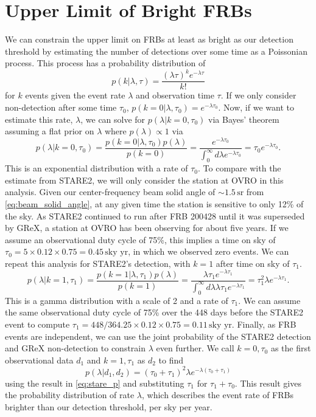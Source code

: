 \section{Upper Limit of Bright FRBs} \label{sec:rate}

We can constrain the upper limit on FRBs at least as bright as our detection threshold by estimating the number of detections over some time as a Poissonian process.
This process has a probability distribution of
\begin{equation}
    p(k|\lambda,\tau) = \frac{(\lambda\tau)^ke^{-\lambda\tau}}{k!}
\end{equation}
for $k$ events given the event rate $\lambda$ and observation time $\tau$.
If we only consider non-detection after some time $\tau_0$, $p(k=0|\lambda,\tau_0)=e^{-\lambda\tau_0}$.
Now, if we want to estimate this rate, $\lambda$, we can solve for $p(\lambda|k=0,\tau_0)$ via Bayes' theorem assuming a flat prior on $\lambda$ where $p(\lambda)\propto1$ via
\begin{equation}
    p(\lambda|k=0,\tau_0) = \frac{p(k=0|\lambda,\tau_0)p(\lambda)}{p(k=0)}=\frac{e^{-\lambda\tau_0}}{\int_{0}^{\infty}d\lambda e^{-\lambda\tau_0}} = \tau_0 e^{-\lambda\tau_0}.
\end{equation}
This is an exponential distribution with a rate of $\tau_0$.
To compare with the estimate from STARE2, we will only consider the station at OVRO in this analysis.
Given our center-frequency beam solid angle of $\sim1.5\,\text{sr}$ from \autoref{eq:beam_solid_angle}, at any given time the station is sensitive to only 12\% of the sky.
As STARE2 continued to run after FRB 200428 until it was superseded by GReX, a station at OVRO has been observing for about five years.
If we assume an observational duty cycle of 75\%, this implies a time on sky of $\tau_0 = 5\times0.12\times0.75 = 0.45\,\text{sky yr}$, in which we observed zero events.
We can repeat this analysis for STARE2's detection, with $k=1$ after time on sky of $\tau_1$.
\begin{equation}
    p(\lambda|k=1,\tau_1) = \frac{p(k=1|\lambda,\tau_1)p(\lambda)}{p(k=1)}=\frac{\lambda\tau_1e^{-\lambda\tau_1}}{\int_{0}^{\infty}d\lambda \lambda\tau_1e^{-\lambda\tau_1}} = \tau_1^2\lambda e^{-\lambda\tau_1}.
    \label{eq:stare_p}
\end{equation}
This is a gamma distribution with a scale of 2 and a rate of $\tau_1$.
We can assume the same observational duty cycle of 75\% over the 448 days before the STARE2 event to compute $\tau_1 = 448/364.25 \times0.12\times0.75 = 0.11\,\text{sky yr}$.
Finally, as FRB events are independent, we can use the joint probability of the STARE2 detection and GReX non-detection to constrain $\lambda$ even further.
We call $k=0,\tau_0$ as the first observational data $d_1$ and $k=1,\tau_1$ as $d_2$ to find
\begin{equation}
    p(\lambda|d_1,d_2) = (\tau_0+\tau_1)^2\lambda e^{-\lambda(\tau_0+\tau_1)}
\end{equation}
using the result in \autoref{eq:stare_p} and substituting $\tau_1$ for $\tau_1+\tau_0$.
This result gives the probability distribution of rate $\lambda$, which describes the event rate of FRBs brighter than our detection threshold, per sky per year.

